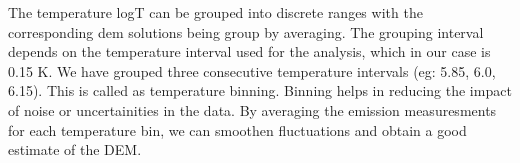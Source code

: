 The temperature logT can be grouped into discrete ranges with the corresponding dem solutions being group by averaging. The grouping interval depends on the temperature interval used for the analysis, which in our case is 0.15 K. We have grouped three consecutive temperature intervals (eg: 5.85, 6.0, 6.15). This is called as temperature binning. Binning helps in reducing the impact of noise or uncertainities in the data. By averaging the emission measuresments for each temperature bin, we can smoothen fluctuations and obtain a good estimate of the DEM.

